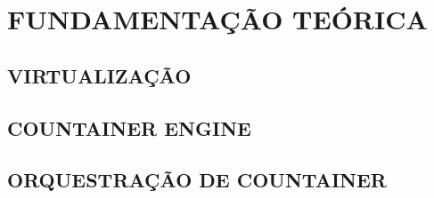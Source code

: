 
\chapter{FUNDAMENTAÇÃO TEÓRICA}
\label{chap:fundamentacaoTeorica}

\section{VIRTUALIZAÇÃO}
\label{sec:virtualizacao}

\section{COUNTAINER ENGINE}
\label{sec:countainerEngine}

\section{ORQUESTRAÇÃO DE COUNTAINER}
\label{sec:orquestracao}
